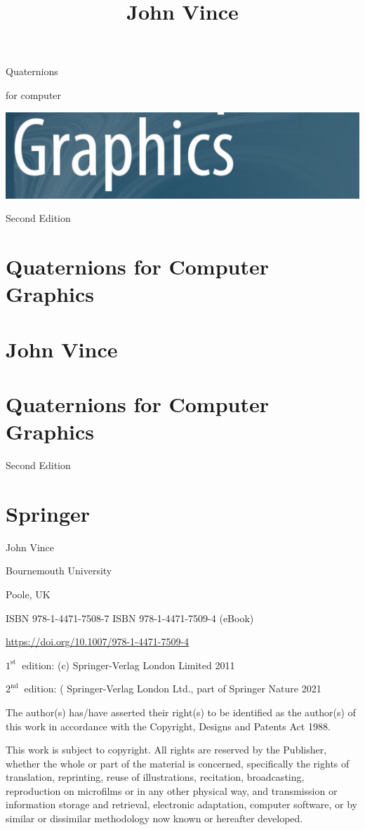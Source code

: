 \documentclass[10pt]{article}
\title{John Vince }
\author{}
\date{}
\begin{document}
\maketitle
Quaternions

for computer

\begin{center}
\includegraphics[max width=\textwidth]{2023_04_20_41f1ceac5a31dc7d1b59g-001}
\end{center}

Second Edition

\section{Quaternions for Computer Graphics}
\section{John Vince}
\section{Quaternions for Computer Graphics}
Second Edition

\section{Springer}
John Vince

Bournemouth University

Poole, UK

ISBN 978-1-4471-7508-7 ISBN 978-1-4471-7509-4 (eBook)

\href{https://doi.org/10.1007/978-1-4471-7509-4}{https://doi.org/10.1007/978-1-4471-7509-4}

$1^{\text {st }}$ edition: (c) Springer-Verlag London Limited 2011

$2^{\text {nd }}$ edition: ( Springer-Verlag London Ltd., part of Springer Nature 2021

The author(s) has/have asserted their right(s) to be identified as the author(s) of this work in accordance with the Copyright, Designs and Patents Act 1988.

This work is subject to copyright. All rights are reserved by the Publisher, whether the whole or part of the material is concerned, specifically the rights of translation, reprinting, reuse of illustrations, recitation, broadcasting, reproduction on microfilms or in any other physical way, and transmission or information storage and retrieval, electronic adaptation, computer software, or by similar or dissimilar methodology now known or hereafter developed.
\end{document}
